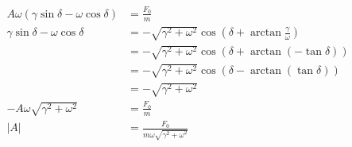 \documentclass{article}
\begin{document}
\begin{enumerate}
        \begin{align*}
          A \omega (\gamma \sin \delta - \omega \cos \delta) & = \frac{F_0}{m}                                                                          \\
          \gamma \sin \delta - \omega \cos \delta            & = -\sqrt{\gamma^2 + \omega^2} \cos \left( \delta + \arctan \frac{\gamma}{\omega} \right) \\
                                                             & = -\sqrt{\gamma^2 + \omega^2} \cos (\delta + \arctan (-\tan \delta))                     \\
                                                             & = -\sqrt{\gamma^2 + \omega^2} \cos (\delta - \arctan (\tan \delta))                      \\
                                                             & = -\sqrt{\gamma^2 + \omega^2}                                                            \\
          -A \omega \sqrt{\gamma^2 + \omega^2}               & = \frac{F_0}{m}                                                                          \\
          |A|                                                & = \frac{F_0}{m \omega \sqrt{\gamma^2 + \omega^2}}
        \end{align*}
\end{enumerate}

\subsection{}
\end{document}
